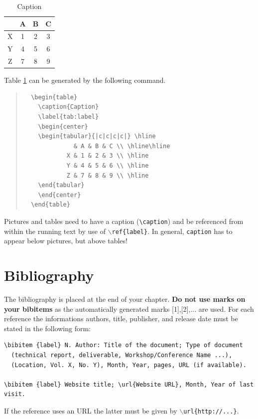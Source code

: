   \begin{table}[h]
    \caption{Caption}
    \label{tab:label}
  	\begin{center}
    \begin{tabular}{|c|c|c|c|} \hline
	          & A & B & C \\ \hline\hline
	        X & 1 & 2 & 3 \\ \hline
	        Y & 4 & 5 & 6 \\ \hline
	        Z & 7 & 8 & 9 \\ \hline
	  \end{tabular}
	  \end{center}
  \end{table}

Table \ref{tab:label} can be generated by the following command.
\begin{quote}
  \begin{verbatim}
  \begin{table}
    \caption{Caption}
    \label{tab:label}
    \begin{center}
    \begin{tabular}{|c|c|c|c|} \hline
	          & A & B & C \\ \hline\hline
	        X & 1 & 2 & 3 \\ \hline
	        Y & 4 & 5 & 6 \\ \hline
	        Z & 7 & 8 & 9 \\ \hline
    \end{tabular}
    \end{center}
  \end{table}
  \end{verbatim}
\end{quote}

Pictures and tables need to have a caption (\verb|\caption|) and be referenced from within the running text by use of \texttt{$\backslash$ref\{label\}}.
In general, \texttt{caption} has to appear below pictures, but above tables!


\section{Bibliography}

The bibliography is placed at the end of your chapter. 
\textbf{Do not use marks on your bib\-items} as the automatically generated marks [1],[2],... are used.
For each reference the informations authors, title, publisher, and release date must be stated in the following form:

\begin{verbatim}
\bibitem {label} N. Author: Title of the document; Type of document 
  (technical report, deliverable, Workshop/Conference Name ...), 
  (Location, Vol. X, No. Y), Month, Year, pages, URL (if available).

\bibitem {label} Website title; \url{Website URL}, Month, Year of last visit.
\end{verbatim}
If the reference uses an URL the latter must be given by \texttt{$\backslash$url\{http://...\}}.

